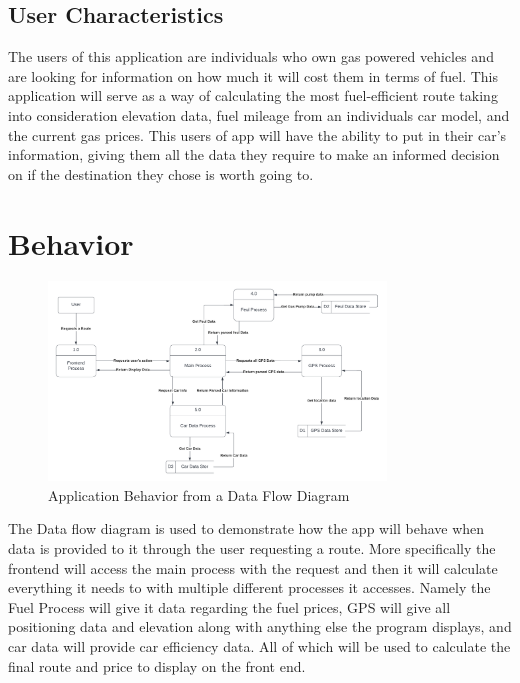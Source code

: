 \documentclass[12pt]{article}
\begin{document}
\subsection{User Characteristics} \label{SecUserCharacteristics}

The users of this application are individuals who own gas powered vehicles and are looking for information on how much it will cost them in terms of fuel. This application will serve as a way of calculating the most fuel-efficient route taking into consideration elevation data, fuel mileage from an individuals car model, and the current gas prices. This users of app will have the ability to put in their car’s information, giving them all the data they require to make an informed decision on if the destination they chose is worth going to.

\newpage
\section{Behavior}

\begin{figure}[h!]
  \begin{center}
   \includegraphics[width=0.8\textwidth]{DataFlowDiagram.png}
  \caption{Application Behavior from a Data Flow Diagram}
  \label{Fig_DataFlow} 
  \end{center}
\end{figure}

The Data flow diagram is used to demonstrate how the app will behave when data is provided to it through the user requesting a route. More specifically the frontend will access the main process with the request and then it will calculate everything it needs to with multiple different processes it accesses. Namely the Fuel Process will give it data regarding the fuel prices, GPS will give all positioning data and elevation along with anything else the program displays, and car data will provide car efficiency data. All of which will be used to calculate the final route and price to display on the front end. 
\end{document}
